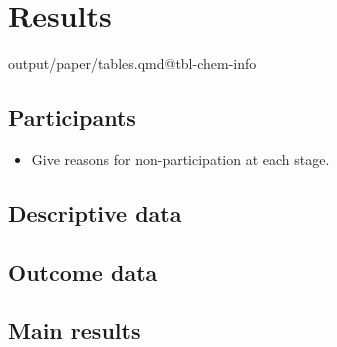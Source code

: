 \documentclass[
  letterpaper,
  DIV=11,
  numbers=noendperiod]{scrartcl}
\providecommand{\tightlist}{%
  \setlength{\itemsep}{0pt}\setlength{\parskip}{0pt}}\usepackage{longtable,booktabs,array}
\begin{document}
\section{Results}\label{sec-res}

output/paper/tables.qmd@tbl-chem-info

\subsection{Participants}\label{sec-res-participants}

\begin{itemize}
\tightlist
\item
  Give reasons for non-participation at each stage.
\end{itemize}

\subsection{Descriptive data}\label{sec-res-pop-desc}

\subsection{Outcome data}\label{sec-res-out-desc}

\subsection{Main results}\label{sec-res-main}
\end{document}
